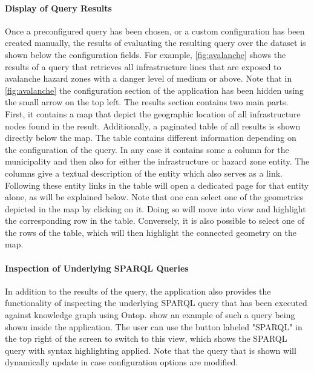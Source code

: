 \paragraph{Display of Query Results}
Once a preconfigured query has been chosen, or a custom configuration has been created manually, the results of evaluating the resulting query over the dataset is shown below the configuration fields. For example, \cref{fig:avalanche} shows the results of a query that retrieves all infrastructure lines that are exposed to avalanche hazard zones with a danger level of medium or above. Note that in \cref{fig:avalanche} the configuration section of the application has been hidden using the small arrow on the top left.
The results section contains two main parts. First, it contains a map that depict the geographic location of all infrastructure nodes found in the result. Additionally, a paginated table of all results is shown directly below the map. The table contains different information depending on the configuration of the query. In any case it contains some a column for the municipality and then also for either the infrastructure or hazard zone entity. The columns give a textual description of the entity which also serves as a link. Following these entity links in the table will open a dedicated page for that entity alone, as will be explained below.
Note that one can select one of the geometries depicted in the map by clicking on it. Doing so will move into view and highlight the corresponding row in the table. Conversely, it is also possible to select one of the rows of the table, which will then highlight the connected geometry on the map.

\paragraph{Inspection of Underlying SPARQL Queries}
In addition to the results of the query, the application also provides the functionality of inspecting the underlying SPARQL query that has been executed against knowledge graph using Ontop.  show an example of such a query being shown inside the application. The user can use the button labeled "SPARQL" in the top right of the screen to switch to this view, which shows the SPARQL query with syntax highlighting applied. Note that the query that is shown will dynamically update in case configuration options are modified.

